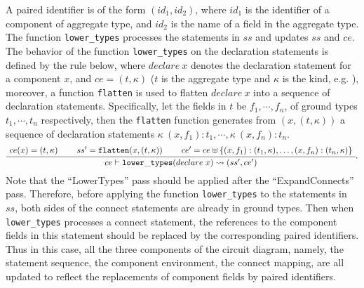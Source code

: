 A paired identifier is of the form $(id_1, id_2)$, where $id_1$ is the identifier of a component of aggregate type, and $id_2$ is the name of a field in the aggregate type. 
The function {\tt lower\_types} processes the statements in $ss$ and updates $ss$ and $ce$. 
The behavior of the function {\tt lower\_types} on the declaration statements is defined by the rule below, where $declare\ x$ denotes the declaration statement for a component $x$, and $ce=(t, \kappa)$ ($t$ is the aggregate type and $\kappa$ is the kind, e.g. ), moreover, a function  {\tt flatten} is used to flatten $declare\ x$ into a sequence of declaration statements.  Specifically, let the fields in $t$ be $f_1, \cdots, f_n$, of ground types $t_1, \cdots, t_n$ respectively, then the {\tt flatten} function generates from $(x, (t, \kappa))$ a sequence of declaration statements $\kappa\ (x, f_1): t_1, \cdots, \kappa\ (x, f_n): t_n$.
  {\begin{gather}
    \inferiii[]
    {\seqq{ce\vdash{\tt lower\_types}(declare\;x) \rightsquigarrow (ss',ce')}}
    {\seqq{ce(x) = (t, \kappa)}}
    {\seqq{ ss' ={\tt flatten}(x, (t, \kappa))}}
    {\seqq{ce'=ce\uplus \{(x, f_1): (t_{1},\kappa), \dots,(x, f_n):(t_{n}, \kappa)\}}}.
    \end{gather}}
Note that the ``LowerTypes'' pass should be applied after the ``ExpandConnects'' pass. 
Therefore, before applying the function {\tt lower\_types} to the statements in $ss$, both sides of the connect statements are already in ground types. 
Then when {\tt lower\_types}  processes a connect statement, the references to the component fields in this statement should be replaced by the corresponding paired identifiers. Thus in this case, all the three components of the circuit diagram, namely, the statement sequence, the component environment, the connect mapping, are all updated to reflect the replacements of component fields by paired identifiers. 

